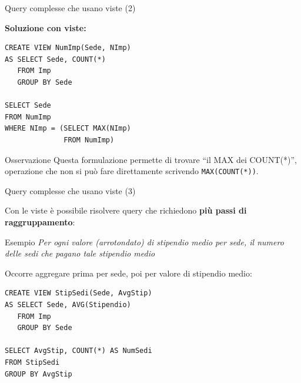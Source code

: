 \documentclass[aspectratio=169]{beamer}
\begin{document}
\begin{frame}[fragile]{Query complesse che usano viste (2)}

\textbf{Soluzione con viste:}

\begin{lstlisting}
CREATE VIEW NumImp(Sede, NImp)
AS SELECT Sede, COUNT(*)
   FROM Imp
   GROUP BY Sede

SELECT Sede
FROM NumImp
WHERE NImp = (SELECT MAX(NImp)
              FROM NumImp)
\end{lstlisting}

\begin{block}{Osservazione}
Questa formulazione permette di trovare ``il MAX dei COUNT(*)'', operazione che \alert{non si può fare} direttamente scrivendo \texttt{MAX(COUNT(*))}.
\end{block}

\end{frame}

\begin{frame}[fragile]{Query complesse che usano viste (3)}

Con le viste è possibile risolvere query che richiedono \textbf{più passi di raggruppamento}:

\begin{block}{Esempio}
\textit{Per ogni valore (arrotondato) di stipendio medio per sede, il numero delle sedi che pagano tale stipendio medio}
\end{block}

\vspace{4pt}
Occorre aggregare prima per sede, poi per valore di stipendio medio:

\begin{lstlisting}
CREATE VIEW StipSedi(Sede, AvgStip)
AS SELECT Sede, AVG(Stipendio)
   FROM Imp
   GROUP BY Sede

SELECT AvgStip, COUNT(*) AS NumSedi
FROM StipSedi
GROUP BY AvgStip
\end{lstlisting}

\end{frame}
\end{document}
